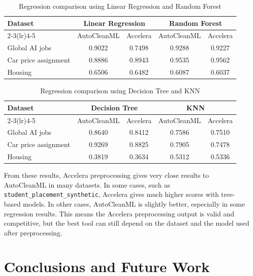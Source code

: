 \documentclass[12pt,a4paper]{report}
\begin{document}
\begin{table}[!htbp]
\centering
\small
\caption{Regression comparison using Linear Regression and Random Forest}
\label{tab:regression-lr-rf-autoclean-accelera}
\begin{tabular}{p{}cccc}
\toprule
Dataset & \multicolumn{2}{c}{Linear Regression} & \multicolumn{2}{c}{Random Forest} \\
\cmidrule(lr){2-3}\cmidrule(lr){4-5}
 & AutoCleanML & Accelera & AutoCleanML & Accelera \\
\midrule
Global AI jobs & 0.9022 & 0.7498 & 0.9288 & 0.9227 \\
Car price assignment & 0.8886 & 0.8943 & 0.9535 & 0.9562 \\
Housing & 0.6506 & 0.6482 & 0.6087 & 0.6037 \\
\bottomrule
\end{tabular}
\end{table}

\begin{table}[!htbp]
\centering
\small
\caption{Regression comparison using Decision Tree and KNN}
\label{tab:regression-dt-knn-autoclean-accelera}
\begin{tabular}{p{}cccc}
\toprule
Dataset & \multicolumn{2}{c}{Decision Tree} & \multicolumn{2}{c}{KNN} \\
\cmidrule(lr){2-3}\cmidrule(lr){4-5}
 & AutoCleanML & Accelera & AutoCleanML & Accelera \\
\midrule
Global AI jobs & 0.8640 & 0.8412 & 0.7586 & 0.7510 \\
Car price assignment & 0.9269 & 0.8825 & 0.7905 & 0.7478 \\
Housing & 0.3819 & 0.3634 & 0.5312 & 0.5336 \\
\bottomrule
\end{tabular}
\end{table}



From these results, Accelera preprocessing gives very close results to
AutoCleanML in many datasets. In some cases, such as
\texttt{student\_placement\_synthetic}, Accelera gives much higher scores with
tree-based models. In other cases, AutoCleanML is slightly better, especially
in some regression results. This means the Accelera preprocessing output is
valid and competitive, but the best tool can still depend on the dataset and
the model used after preprocessing.

\chapter{Conclusions and Future Work}
\end{document}
